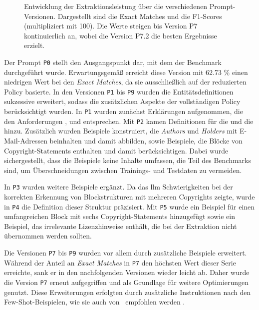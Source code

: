 \begin{figure}[ht]
    \centering
    \caption{Entwicklung der Extraktionsleistung über die verschiedenen Prompt-Versionen. Dargestellt sind die Exact Matches und die F1-Scores (multipliziert mit 100). Die Werte steigen bis Version P7 kontinuierlich an, wobei die Version P7.2 die besten Ergebnisse erzielt.}
    \label{fig:prompt-engineering-results}
\end{figure}

Der Prompt \texttt{P0} stellt den Ausgangspunkt dar, mit dem der Benchmark durchgeführt wurde.
Erwartungsgemäß erreicht diese Version mit \num{62.73} \% einen niedrigen Wert bei den \textit{Exact Matches}, da sie ausschließlich auf der reduzierten Policy basierte.
In den Versionen \texttt{P1} bis \texttt{P9} wurden die Entitätsdefinitionen sukzessive erweitert, sodass die zusätzlichen Aspekte der vollständigen Policy berücksichtigt wurden.
In \texttt{P1} wurden zunächst Erklärungen aufgenommen, die den Anforderungen ,  und  entsprechen.
Mit \texttt{P2} kamen Definitionen für die  und die  hinzu.
Zusätzlich wurden Beispiele konstruiert, die \textit{Authors} und \textit{Holders} mit E-Mail-Adressen beinhalten und damit  abbilden, sowie Beispiele, die Blöcke von Copyright-Statements enthalten und damit  berücksichtigen.
Dabei wurde sichergestellt, dass die Beispiele keine Inhalte umfassen, die Teil des Benchmarks sind, um Überschneidungen zwischen Trainings- und Testdaten zu vermeiden.

In \texttt{P3} wurden weitere Beispiele ergänzt.
Da das \gls{llm} Schwierigkeiten bei der korrekten Erkennung von Blockstrukturen mit mehreren Copyrights zeigte, wurde in \texttt{P4} die Definition dieser Struktur präzisiert.
Mit \texttt{P5} wurde ein Beispiel für einen umfangreichen Block mit sechs Copyright-Statements hinzugefügt sowie ein Beispiel, das irrelevante Lizenzhinweise enthält, die bei der Extraktion nicht übernommen werden sollten.

Die Versionen \texttt{P7} bis \texttt{P9} wurden vor allem durch zusätzliche Beispiele erweitert.
Während der Anteil an \textit{Exact Matches} in \texttt{P7} den höchsten Wert dieser Serie erreichte, sank er in den nachfolgenden Versionen wieder leicht ab.
Daher wurde die Version \texttt{P7} erneut aufgegriffen und als Grundlage für weitere Optimierungen genutzt.
Diese Erweiterungen erfolgten durch zusätzliche Instruktionen nach den Few-Shot-Beispielen, wie sie auch von \citeauthor{cheng_novel_2024}\ empfohlen werden \autocite{cheng_novel_2024}.

